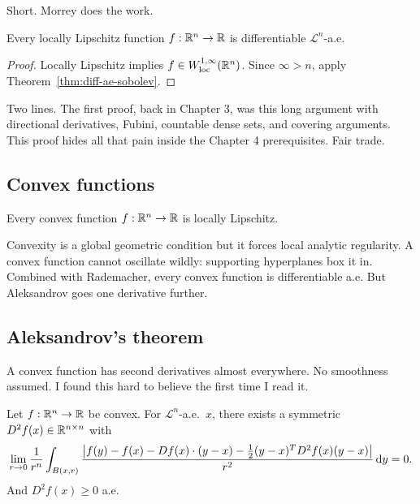 Short. Morrey does the work.

\begin{theorem}\label{thm:rademacher-v2}
Every locally Lipschitz function $f : \mathbb{R}^n \to \mathbb{R}$ is differentiable $\mathcal{L}^n$-a.e.
\end{theorem}

\begin{proof}
Locally Lipschitz implies $f \in W^{1,\infty}_{\mathrm{loc}}(\mathbb{R}^n)$. Since $\infty > n$, apply Theorem~\ref{thm:diff-ae-sobolev}.
\end{proof}

Two lines. The first proof, back in Chapter 3, was this long argument with directional derivatives, Fubini, countable dense sets, and covering arguments. This proof hides all that pain inside the Chapter 4 prerequisites. Fair trade.

\subsection{Convex functions}\label{subsec:convex}

\begin{theorem}\label{thm:convex-lip}
Every convex function $f : \mathbb{R}^n \to \mathbb{R}$ is locally Lipschitz.
\end{theorem}

Convexity is a global geometric condition but it forces local analytic regularity. A convex function cannot oscillate wildly: supporting hyperplanes box it in. Combined with Rademacher, every convex function is differentiable a.e. But Aleksandrov goes one derivative further.

\subsection{Aleksandrov's theorem}\label{subsec:aleksandrov}

A convex function has second derivatives almost everywhere. No smoothness assumed. I found this hard to believe the first time I read it.

\begin{theorem}[Aleksandrov]\label{thm:aleksandrov}
Let $f : \mathbb{R}^n \to \mathbb{R}$ be convex. For $\mathcal{L}^n$-a.e.\ $x$, there exists a symmetric $D^2 f(x) \in \mathbb{R}^{n \times n}$ with
\[
    \lim_{r \to 0} \frac{1}{r^n} \int_{B(x,r)} \frac{\left|f(y) - f(x) - Df(x) \cdot (y - x) - \frac{1}{2}(y-x)^T D^2 f(x) (y-x)\right|}{r^2} \,\mathrm{d} y = 0.
\]
And $D^2 f(x) \ge 0$ a.e.
\end{theorem}

